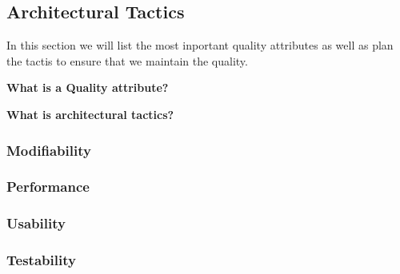 \subsection{Architectural Tactics}

In this section we will list the most inportant quality attributes as 
well as plan the tactis to ensure that we maintain the quality.

{\bf What is a Quality attribute? }

{\bf What is architectural tactics? }


\subsubsection{Modifiability}



\subsubsection{Performance}

\subsubsection{Usability}

\subsubsection{Testability}

